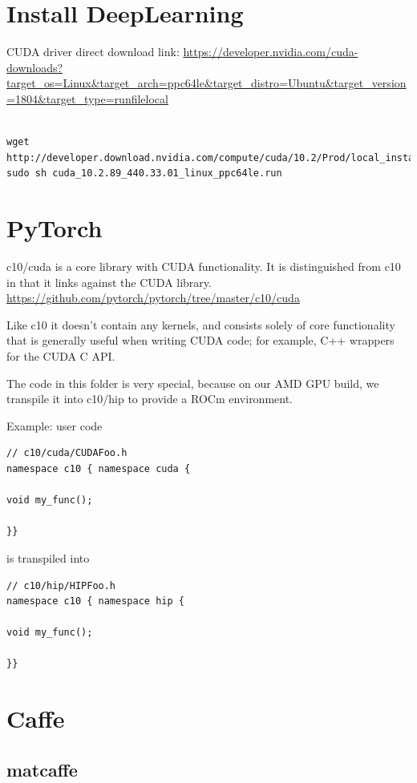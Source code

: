\chapter{Install DeepLearning}


CUDA driver direct download link:
\url{https://developer.nvidia.com/cuda-downloads?target_os=Linux&target_arch=ppc64le&target_distro=Ubuntu&target_version=1804&target_type=runfilelocal}
\begin{verbatim}

wget http://developer.download.nvidia.com/compute/cuda/10.2/Prod/local_installers/cuda_10.2.89_440.33.01_linux_ppc64le.run
sudo sh cuda_10.2.89_440.33.01_linux_ppc64le.run

\end{verbatim}

\chapter{PyTorch}

c10/cuda is a core library with CUDA functionality. It is distinguished from c10
in that it links against the CUDA library.
\url{https://github.com/pytorch/pytorch/tree/master/c10/cuda}

Like c10 it doesn't contain any kernels, and consists solely of core
functionality that is generally useful when writing CUDA code; for example, C++
wrappers for the CUDA C API.

The code in this folder is very special, because on our AMD GPU build, we
transpile it into c10/hip to provide a ROCm environment.

Example: user code
\begin{lstlisting}
// c10/cuda/CUDAFoo.h
namespace c10 { namespace cuda {

void my_func();

}}
\end{lstlisting}
is transpiled into
\begin{lstlisting}
// c10/hip/HIPFoo.h
namespace c10 { namespace hip {

void my_func();

}}
\end{lstlisting}



\chapter{Caffe}

\section{matcaffe}
\label{sec:matcaffe}

